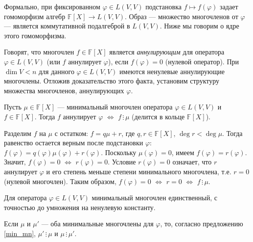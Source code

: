 {\footnotesize Формально, при фиксированном $\varphi \in L(V, V)$ подстановка  $f\mapsto f(\varphi)$ задает гомоморфизм алгебр $\mathbb{F}[X] \to L(V, V)$. Образ --- множество многочленов от $\varphi$ --- является
коммутативной подалгеброй в $L(V, V)$. Ниже мы говорим о ядре этого гомоморфизма.}

\otstup

Говорят, что многочлен $f\in \mathbb{F}[X]$ является {\it аннулирующим} для оператора $\varphi \in L(V, V)$
(или $f$ аннулирует $\varphi$), если $f(\varphi) = 0$ (нулевой оператор).
При $\dim V<n$ для данного $\varphi \in L(V, V)$ имеются ненулевые аннулирующие многочлены.
Отложив доказательство этого факта, установим структуру множества многочленов, аннулирующих $\varphi$.



\begin{predl}\label{min_mn}
Пусть  $\mu \in \mathbb{F}[X]$ 
 --- минимальный многочлен оператора $\varphi \in L(V, V)$ и $f\in \mathbb{F}[X]$. 
Тогда $f$ аннулирует $\varphi$ $\Leftrightarrow$  $f\, \vdots \, \mu$ 
(делится в кольце $\mathbb{F}[X]$).
\end{predl}
\dok  Разделим $f$ на $\mu$  с остатком: $f = q\mu + r$, где $q,r \in \mathbb{F}[X]$, $\deg r < \deg \mu$.
Тогда равенство остается верным после подстановки $\varphi$: $f (\varphi) = q(\varphi)\mu (\varphi)+ r(\varphi)$.
Поскольку $\mu (\varphi) = 0$, имеем $f (\varphi) =  r (\varphi)$. \\
Значит,  $f (\varphi)= 0$ $\Leftrightarrow$  $r (\varphi)=0$.
Условие $r (\varphi)=0$ означает, что $r$ аннулирует $\varphi$ и его степень меньше степени минимального многочлена, 
т.е. $r=0$ (нулевой многочлен). Таким образом, 
$f (\varphi)= 0$ $\Leftrightarrow$  $r=0$ $\Leftrightarrow$ $f\, \vdots \, \mu$. 
\edok

\begin{sled}\label{min_mn_ed}
Для оператора $\varphi \in L(V, V)$ минимальный многочлен единственный, 
с точностью до умножения на ненулевую константу.
\end{sled}
\dok  Если  $\mu$ и $\mu '$ --- оба минимальные многочлены для $\varphi$, 
то, согласно предложению \ref{min_mn}, $\mu' \, \vdots \, \mu$ и $\mu \, \vdots \, \mu'$. 
\edok





